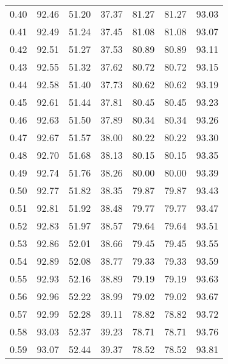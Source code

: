 \begin{tabular}{|c|c|c|c|c|c|c|}
      0.40 &     92.46 &     51.20 &      37.37 &   81.27 &      81.27 &         93.03 \\
      0.41 &     92.49 &     51.24 &      37.45 &   81.08 &      81.08 &         93.07 \\
      0.42 &     92.51 &     51.27 &      37.53 &   80.89 &      80.89 &         93.11 \\
      0.43 &     92.55 &     51.32 &      37.62 &   80.72 &      80.72 &         93.15 \\
      0.44 &     92.58 &     51.40 &      37.73 &   80.62 &      80.62 &         93.19 \\
      0.45 &     92.61 &     51.44 &      37.81 &   80.45 &      80.45 &         93.23 \\
      0.46 &     92.63 &     51.50 &      37.89 &   80.34 &      80.34 &         93.26 \\
      0.47 &     92.67 &     51.57 &      38.00 &   80.22 &      80.22 &         93.30 \\
      0.48 &     92.70 &     51.68 &      38.13 &   80.15 &      80.15 &         93.35 \\
      0.49 &     92.74 &     51.76 &      38.26 &   80.00 &      80.00 &         93.39 \\
      0.50 &     92.77 &     51.82 &      38.35 &   79.87 &      79.87 &         93.43 \\
      0.51 &     92.81 &     51.92 &      38.48 &   79.77 &      79.77 &         93.47 \\
      0.52 &     92.83 &     51.97 &      38.57 &   79.64 &      79.64 &         93.51 \\
      0.53 &     92.86 &     52.01 &      38.66 &   79.45 &      79.45 &         93.55 \\
      0.54 &     92.89 &     52.08 &      38.77 &   79.33 &      79.33 &         93.59 \\
      0.55 &     92.93 &     52.16 &      38.89 &   79.19 &      79.19 &         93.63 \\
      0.56 &     92.96 &     52.22 &      38.99 &   79.02 &      79.02 &         93.67 \\
      0.57 &     92.99 &     52.28 &      39.11 &   78.82 &      78.82 &         93.72 \\
      0.58 &     93.03 &     52.37 &      39.23 &   78.71 &      78.71 &         93.76 \\
      0.59 &     93.07 &     52.44 &      39.37 &   78.52 &      78.52 &         93.81 \\

\end{tabular}
